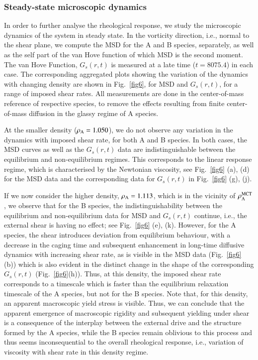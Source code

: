 \subsubsection{Steady-state microscopic dynamics}
%
In order to further analyse the rheological response, we study the microscopic dynamics of the system in steady state. In the vorticity direction, i.e., normal to the shear plane, we compute the MSD for the A and B species, separately, as well as the self part of the van Hove function of which MSD is the second moment.  The van Hove Function, $G_s(r,t)$ is measured at a late time ($t=8075.4$) in each case. The corresponding aggregated plots showing the variation of the dynamics with changing density are shown in Fig.~\ref{fig6}, for MSD and $G_s(r,t)$, for a range of imposed shear rates. All measurements are done in the center-of-mass reference of respective species, to remove the effects resulting from finite center-of-mass diffusion in the glassy regime of A species.

At the smaller density ($\rho_{\rm A} = 1.050$), we do not observe any variation in the dynamics with imposed shear rate, for both A and B species. In both cases, the MSD curves as well as the $G_s(r,t)$ data are indistinguishable between the equilibrium and non-equilibrium regimes. This corresponds to the linear response regime, which is characterised by the Newtonian viscosity, see Fig.~\ref{fig6} (a), (d) for the MSD data and the corresponding data for $G_s(r,t)$ in Fig.~\ref{fig6} (g), (j).

If we now consider the higher density, $\rho_{\rm A} = 1.113$,  which is in the vicinity of $\rho_{\rm A}^{\rm MCT}$, we observe that for the B species, the indistinguishability between the equilibrium and non-equilibrium data for MSD and $G_s(r,t)$ continue, i.e., the external shear is having no effect; see Fig.~\ref{fig6} (e), (k). However, for the A species, the shear introduces deviation from equilibrium behaviour, with a decrease in the caging time and subsequent enhancement in long-time diffusive dynamics with increasing shear rate, as is visible in the MSD data (Fig.~\ref{fig6} (b)) which is also evident in the distinct change in the shape of the corresponding $G_s(r,t)$ (Fig.~\ref{fig6}(h)). Thus, at this density, the imposed shear rate corresponds to a timescale which is faster than the equilibrium relaxation timescale of the A species, but not for the B species. Note that, for this density, an apparent macroscopic yield stress is visible. Thus, we can conclude that the apparent emergence of macroscopic rigidity and subsequent yielding under shear is a consequence of the interplay between the external drive and the structure formed by the A species, while the B species remain oblivious to this process and thus seems inconsequential to the overall rheological response, i.e., variation of viscosity with shear rate in this density regime.

